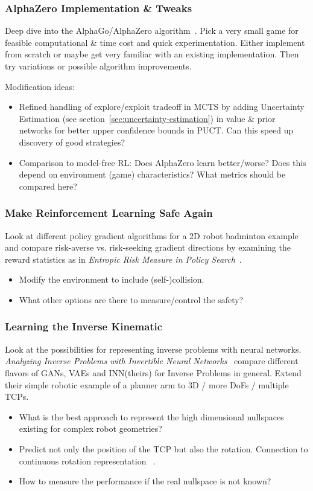 \documentclass[a4paper]{article}
\begin{document}
\subsubsection{AlphaZero Implementation \& Tweaks}
Deep dive into the AlphaGo/AlphaZero algorithm~\cite{Silver2016, Silver2017, Silver2017a}. Pick a very small game for feasible computational \& time cost and quick experimentation. Either implement from scratch or maybe get very familiar with an existing implementation. Then try variations or possible algorithm improvements.

Modification ideas:
\begin{itemize}
  \item Refined handling of explore/exploit tradeoff in MCTS by adding Uncertainty Estimation (see section~\ref{sec:uncertainty-estimation}) in value \& prior networks for better upper confidence bounds in PUCT. Can this speed up discovery of good strategies?
  \item Comparison to model-free RL: Does AlphaZero learn better/worse? Does this depend on environment (game) characteristics? What metrics should be compared here?
\end{itemize}

\subsubsection{Make Reinforcement Learning Safe Again}
Look at different policy gradient algorithms for a 2D robot badminton example and compare risk-averse vs. risk-seeking gradient directions by examining the reward statistics as in \textit{Entropic Risk Measure in Policy Search}~\cite{Nass2019}.
\begin{itemize}
	\item Modify the environment to include (self-)collision.
	\item What other options are there to measure/control the safety?
	\end{itemize}

\subsubsection{Learning the Inverse Kinematic}
Look at the possibilities for representing inverse problems with neural networks.
\textit{Analyzing Inverse Problems with Invertible Neural Networks}~\cite{Ardizzone2018}
compare different flavors of GANs, VAEs and INN(theirs) for Inverse Problems in general. Extend their simple robotic example of a planner arm to 3D / more DoFs / multiple TCPs.
\begin{itemize}
  \item What is the best approach to represent the high dimensional nullspaces existing for complex robot geometries?
  \item Predict not only the position of the TCP but also the rotation. Connection to continuous rotation representation ~\cite{Zhou2018}.
  \item How to measure the performance if the real nullspace is not known?
\end{itemize}
\end{document}
